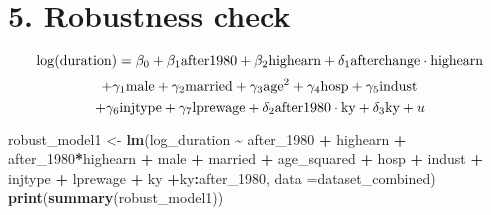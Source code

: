 \documentclass[
]{article}
\newenvironment{Shaded}{\begin{snugshade}}{\end{snugshade}}
\newcommand{\AttributeTok}[1]{\textcolor[rgb]{0.13,0.29,0.53}{#1}}
\newcommand{\FunctionTok}[1]{\textcolor[rgb]{0.13,0.29,0.53}{\textbf{#1}}}
\newcommand{\NormalTok}[1]{#1}
\newcommand{\OtherTok}[1]{\textcolor[rgb]{0.56,0.35,0.01}{#1}}
\newcommand{\SpecialCharTok}[1]{\textcolor[rgb]{0.81,0.36,0.00}{\textbf{#1}}}
\begin{document}
\section{5. Robustness check}\label{robustness-check}

\[\log(\text{duration}) = \beta_0 + \beta_1 \text{after1980} + \beta_2 \text{highearn}
+ \delta_1 \text{afterchange} \cdot \text{highearn} \\\]
\[+ \gamma_1\text{male} + \gamma_2\text{married} + \gamma_3\text{age}^2 \\
+ \gamma_4\text{hosp} + \gamma_5\text{indust} \\\]
\[+ \gamma_6\text{injtype} + \gamma_7\text{lprewage} \\
+ \delta_2 \text{after1980} \cdot \text{ky} + \delta_3 \text{ky} + u
\]

\begin{Shaded}
\begin{Highlighting}[]
\NormalTok{robust\_model1 }\OtherTok{\textless{}{-}} \FunctionTok{lm}\NormalTok{(log\_duration }\SpecialCharTok{\textasciitilde{}}\NormalTok{ after\_1980 }\SpecialCharTok{+}\NormalTok{ highearn }\SpecialCharTok{+}
\NormalTok{after\_1980}\SpecialCharTok{*}\NormalTok{highearn }\SpecialCharTok{+}\NormalTok{ male }\SpecialCharTok{+}\NormalTok{ married }\SpecialCharTok{+}\NormalTok{ age\_squared }\SpecialCharTok{+}\NormalTok{ hosp }
\SpecialCharTok{+}\NormalTok{ indust }\SpecialCharTok{+}\NormalTok{ injtype }\SpecialCharTok{+}\NormalTok{ lprewage }\SpecialCharTok{+}\NormalTok{ ky }\SpecialCharTok{+}\NormalTok{ky}\SpecialCharTok{:}\NormalTok{after\_1980, }\AttributeTok{data =}\NormalTok{dataset\_combined)}
\FunctionTok{print}\NormalTok{(}\FunctionTok{summary}\NormalTok{(robust\_model1))}
\end{Highlighting}
\end{Shaded}
\end{document}
